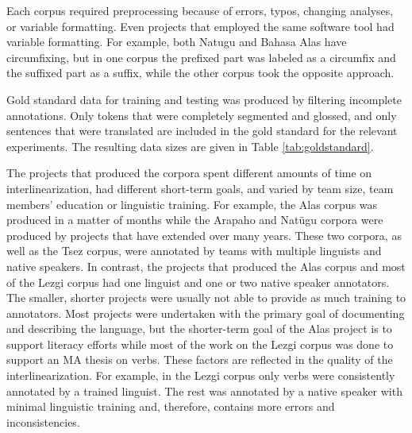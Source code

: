 
Each corpus required preprocessing because of errors, typos, changing analyses, or variable formatting. Even projects that employed the same software tool had variable formatting. For example, both Natugu and Bahasa Alas have circumfixing, but in one corpus the prefixed part was labeled as a circumfix and the suffixed part as a suffix, while the other corpus took the opposite approach. 

Gold standard data for training and testing was produced by filtering incomplete annotations. Only tokens that were completely segmented and glossed, and only sentences that were translated are included in the gold standard for the relevant experiments. The resulting data sizes are given in Table \ref{tab:goldstandard}.

The projects that produced the corpora spent different amounts of time on interlinearization, had different short-term goals, and varied by team size, team members' education or linguistic training. For example, the Alas corpus was produced in a matter of months while the Arapaho and Natügu corpora were produced by projects that have extended over many years. These two corpora, as well as the Tsez corpus, were annotated by teams with multiple linguists and native speakers. In contrast, the projects that produced the Alas corpus and most of the Lezgi corpus had one linguist and one or two native speaker annotators. The smaller, shorter projects were usually not able to provide as much training to annotators. Most projects were undertaken with the primary goal of documenting and describing the language, but the shorter-term goal of the Alas project is to support literacy efforts while most of the work on the Lezgi corpus was done to support an MA thesis on verbs. These factors are reflected in the quality of the interlinearization. For example, in the Lezgi corpus only verbs were consistently annotated by a trained linguist. The rest was annotated by a native speaker with minimal linguistic training and, therefore, contains more errors and inconsistencies. 


